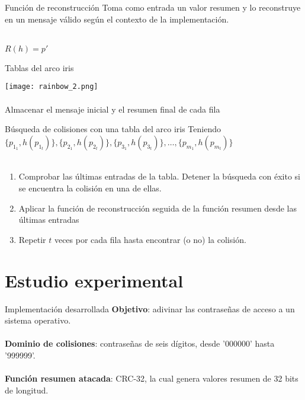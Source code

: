 \documentclass{beamer}
\begin{document}
\begin{frame}{Función de reconstrucción}
	Toma como entrada un valor resumen y lo reconstruye en un mensaje válido según el contexto de la implementación.\\
	~\\
	\begin{center}
		$R(h) = p'$
	\end{center}
\end{frame}

\begin{frame}{Tablas del arco iris}

	\centering
	\texttt{[image: rainbow\_2.png]}\\
	~\\
	Almacenar el mensaje inicial y el resumen final de cada fila\\

\end{frame}

\begin{frame}{Búsqueda de colisiones con una tabla del arco iris}
	Teniendo $\{p_{1_1}, h(p_{1_t})\}, \{p_{2_1}, h(p_{2_t})\}, \{p_{3_1}, h(p_{3_t})\}, \dots, \{p_{m_1}, h(p_{m_t})\}$\\
	~\\
	\pause
	\begin{enumerate}

		\item Comprobar las últimas entradas de la tabla. Detener la búsqueda con éxito si se encuentra la colisión en una de ellas.
		\pause
		\item Aplicar la función de reconstrucción seguida de la función resumen desde las últimas entradas
		\pause
	\item Repetir $t$ veces por cada fila hasta encontrar (o no) la colisión.

	\end{enumerate}
\end{frame}

\section{Estudio experimental}

\begin{frame}{Implementación desarrollada}
	\pause
	\textbf{Objetivo}: adivinar las contraseñas de acceso a un sistema operativo.\\
	~\\
	\pause
	\textbf{Dominio de colisiones}: contraseñas de seis dígitos, desde '000000' hasta '999999'.\\
	~\\
	\pause
	\textbf{Función resumen atacada}: CRC-32, la cual genera valores resumen de 32 bits de longitud.
\end{frame}
\end{document}
